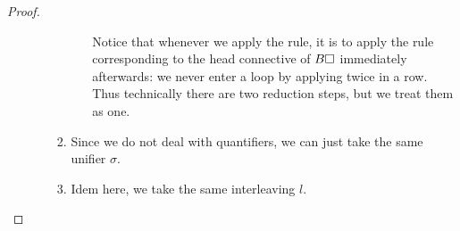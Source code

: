 \begin{proof}
\begin{enumerate}[itemsep=0.8em]
\begin{itemize}
\begin{enumerate}[itemsep=0.4em]
\begin{itemize}
          Notice that whenever we apply the {} rule, it is to apply
          the rule corresponding to the head connective of $B\square$ immediately
          afterwards: we never enter a loop by applying {} twice in
          a row. Thus technically there are two reduction steps, but we treat
          them as one.
        \end{itemize}
        
        

        \item Since we do not deal with quantifiers, we can just take the same
        unifier $\sigma$.

        \item Idem here, we take the same interleaving $l$.
      \end{enumerate}
    \end{itemize} 
  \end{enumerate}
\end{proof}


